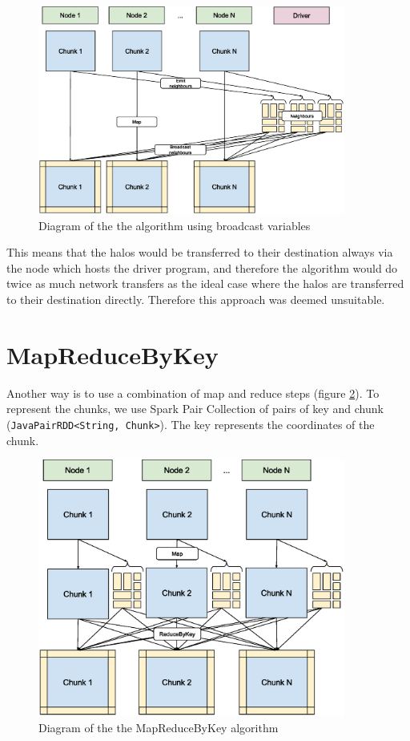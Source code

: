 \documentclass{l4proj}
\begin{document}
\begin{figure}
\centering
\includegraphics[width=0.9\textwidth]{images/Broadcast_variable.eps}
\caption{Diagram of the the algorithm using broadcast variables}
\label{fig:broadcast}
\end{figure}

This means that the halos would be transferred to their destination always via
the node which hosts the driver program, and therefore the algorithm would do 
twice as much network transfers as the ideal case where the halos are transferred
to their destination directly. Therefore this approach was deemed unsuitable. 

\section{MapReduceByKey}

Another way is to use a combination of map and reduce steps (figure \ref{fig:map_reduce}). To represent the 
chunks, we use Spark Pair Collection of pairs of key and chunk (\texttt{JavaPairRDD<String, Chunk>}). The key represents
the coordinates of the chunk.

\begin{figure}
\centering
\includegraphics[width=0.9\textwidth]{images/MapReduce.eps}
\caption{Diagram of the the MapReduceByKey algorithm}
\label{fig:map_reduce}
\end{figure}
\end{document}
